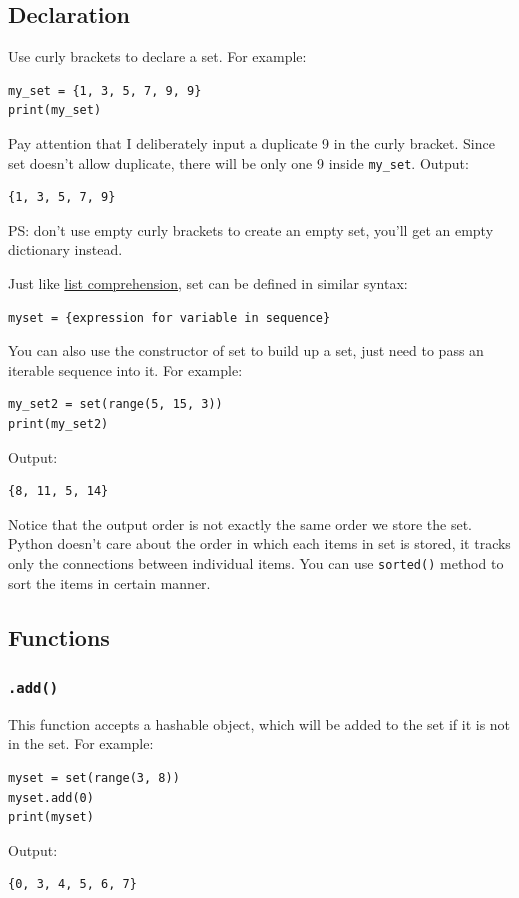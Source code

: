 \documentclass[12pt]{book}
\begin{document}
\subsection{Declaration}
\label{sec:org6f36b0e}
Use curly brackets to declare a set. For example:
\begin{verbatim}
my_set = {1, 3, 5, 7, 9, 9}
print(my_set)
\end{verbatim}
Pay attention that I deliberately input a duplicate 9 in the curly bracket. Since set doesn't allow duplicate, there will be only one 9 inside \texttt{my\_set}. Output:
\begin{verbatim}
{1, 3, 5, 7, 9}
\end{verbatim}
PS: don't use empty curly brackets to create an empty set, you'll get an empty dictionary instead.

Just like \hyperref[org3b2d900]{list comprehension}, set can be defined in similar syntax:
\begin{verbatim}
myset = {expression for variable in sequence}
\end{verbatim}

You can also use the constructor of set to build up a set, just need to pass an iterable sequence into it. For example:
\begin{verbatim}
my_set2 = set(range(5, 15, 3))
print(my_set2)
\end{verbatim}
Output:
\begin{verbatim}
{8, 11, 5, 14}
\end{verbatim}
Notice that the output order is not exactly the same order we store the set. Python doesn't care about the order in which each items in set is stored, it tracks only the connections between individual items. You can use \texttt{sorted()} method to sort the items in certain manner.
\subsection{Functions}
\label{sec:orgb09d623}
\subsubsection{\texttt{.add()}}
\label{sec:orgcd501da}
This function accepts a hashable object, which will be added to the set if it is not in the set. For example:
\begin{verbatim}
myset = set(range(3, 8))
myset.add(0)
print(myset)
\end{verbatim}
Output:
\begin{verbatim}
{0, 3, 4, 5, 6, 7}
\end{verbatim}
\end{document}
